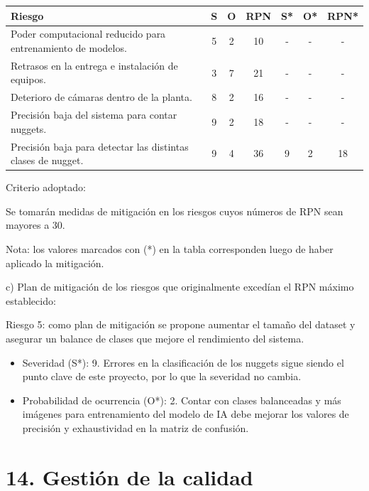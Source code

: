 \documentclass[
11pt, %
]{charter}
\begin{document}
\begin{table}[htpb]
\centering
\begin{tabularx}{\linewidth}{@{}|X|c|c|c|c|c|c|@{}}
\hline
\rowcolor[HTML]{C0C0C0} 
Riesgo & S & O & RPN & S* & O* & RPN* \\ \hline
Poder computacional reducido para entrenamiento de modelos.       & 5  &  2 & 10    & -   &  -  & -     \\ \hline
Retrasos en la entrega e instalación de equipos.       & 3  & 7  & 21    & -   & -   & -     \\ \hline
Deterioro de cámaras dentro de la planta.       & 8  & 2  &  16   & -   & -   & -     \\ \hline
Precisión baja del sistema para contar nuggets.       & 9  & 2  &  18   & -   & -   &  -    \\ \hline
Precisión baja para detectar las distintas clases de nugget.       & 9  & 4  &   36  & 9   &  2  &  18   \\ \hline
\end{tabularx}%
\end{table}

Criterio adoptado: 

Se tomarán medidas de mitigación en los riesgos cuyos números de RPN sean mayores a 30.

Nota: los valores marcados con (*) en la tabla corresponden luego de haber aplicado la mitigación.

c) Plan de mitigación de los riesgos que originalmente excedían el RPN máximo establecido:
 
Riesgo 5: como plan de mitigación se propone aumentar el tamaño del dataset y asegurar un balance de clases que mejore el rendimiento del sistema.
  \begin{itemize}
	\item Severidad (S*): 9.
          Errores en la clasificación de los nuggets sigue siendo el punto clave de este proyecto, por lo que la severidad no cambia.
	\item Probabilidad de ocurrencia (O*): 2.
          Contar con clases balanceadas y más imágenes para entrenamiento del modelo de IA debe mejorar los valores de precisión y exhaustividad en la matriz de confusión.
	\end{itemize}



\section{14. Gestión de la calidad}
\label{sec:calidad}
\end{document}
